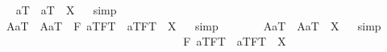 \begin{isabellebody}
\isanewline
\isanewline
\ \isamarkupfalse%
\ {\isachardoublequoteopen}a\isactrlsup T\ \isactrlbold {\isacharequal}\ a\isactrlsup T\ {\isacharequal}\ X{\isachardoublequoteclose}%
\isadelimproof
\ %
\endisadelimproof
%
\isatagproof
{}\isamarkupfalse%
\ simp\ \isamarkupfalse%
\ \ \ \ \ \ \ \ \ \ \ \ \ \ \ \ \ \ \ \ \ \ \ \ \ \ \ \ \ \ \ \ \ \ \ \ \ \ \ \ %
%
\endisatagproof
{\isafoldproof}%
%
\isadelimproof
%
\endisadelimproof
\isanewline
\ \isamarkupfalse%
\ {\isachardoublequoteopen}{\isacharparenleft}{\isasymlparr}A{\isacharbang}{\isacharcomma}a\isactrlsup T{\isasymrparr}\ \isactrlbold {\isasymand}\ {\isasymlparr}A{\isacharbang}{\isacharcomma}a\isactrlsup T{\isasymrparr}\ \isactrlbold {\isasymand}\ \isactrlbold {\isasymbox}{\isacharparenleft}\isactrlbold {\isasymforall}F{\isachardot}\ {\isasymlbrace}a\isactrlsup T{\isacharcomma}F\isactrlsup T{\isasymrbrace}\ \isactrlbold {\isasymequiv}\ {\isasymlbrace}a\isactrlsup T{\isacharcomma}F\isactrlsup T{\isasymrbrace}{\isacharparenright}{\isacharparenright}\ {\isacharequal}\ X{\isachardoublequoteclose}%
\isadelimproof
\ %
\endisadelimproof
%
\isatagproof
{}\isamarkupfalse%
\ simp\ \isamarkupfalse%
\ \ \ %
%
\endisatagproof
{\isafoldproof}%
%
\isadelimproof
%
\endisadelimproof
\isanewline
\ \isamarkupfalse%
\ {\isachardoublequoteopen}{\isacharparenleft}{\isasymlparr}A{\isacharbang}{\isacharcomma}a\isactrlsup T{\isasymrparr}\ \isactrlbold {\isasymand}\ {\isasymlparr}A{\isacharbang}{\isacharcomma}a\isactrlsup T{\isasymrparr}{\isacharparenright}\ {\isacharequal}\ X{\isachardoublequoteclose}%
\isadelimproof
\ %
\endisadelimproof
%
\isatagproof
{}\isamarkupfalse%
\ simp\ \isamarkupfalse%
\ \ \ \ \ \ \ \ \ \ \ \ \ \ \ \ \ \ \ \ \ \ \ \ \ \ \ \ \ %
%
\endisatagproof
{\isafoldproof}%
%
\isadelimproof
%
\endisadelimproof
\isanewline
\ \isamarkupfalse%
\ {\isachardoublequoteopen}\isactrlbold {\isasymbox}{\isacharparenleft}\isactrlbold {\isasymforall}F{\isachardot}\ {\isasymlbrace}a\isactrlsup T{\isacharcomma}F\isactrlsup T{\isasymrbrace}\ \isactrlbold {\isasymequiv}\ {\isasymlbrace}a\isactrlsup T{\isacharcomma}F\isactrlsup T{\isasymrbrace}{\isacharparenright}\ {\isacharequal}\ X{\isachardoublequoteclose}%

\end{isabellebody}
